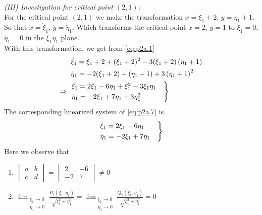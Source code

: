 \documentclass[../main-sheet.tex]{subfiles}
\begin{document}
\begin{soln}[a]
    
    \emph{(III) Investigation for critical point \((2,1)\):}\\
    For the critical point \((2,1)\) we make the transformation \(x=\xi_1+2\), \(y=\eta_1+1\). So that \(\dot{x}=\dot{\xi}_1\), \(\dot{y}=\dot{\eta}_1\). Which transforms the critical point \(x=2\), \(y=1\) to \(\xi_1=0\), \(\eta_1=0\) in the \(\xi_1\eta_1\) plane.\\
    With this transformation, we get from \eqref{eq:p2a.1}
    \begin{align}
        &\dot{\xi}_1=\xi_1+2+(\xi_1+2)^2-3(\xi_1+2)\left(\eta_1+1\right)\notag\\
        &\dot{\eta}_1=-2(\xi_1+2)+(\eta_1+1)+3\left(\eta_1+1\right)^2\notag\\
        \Rightarrow\;\;&\begin{aligned}
            \begin{rcases}
                \dot{\xi}_1=2\xi_1-6\eta_1+\xi_1^2-3\xi_1\eta_1\quad\\
                \dot{\eta}_1=-2\xi_1+7\eta_1+3\eta_1^2
            \end{rcases}
        \end{aligned}\label{eq:p2a.7}
    \end{align}
    The corresponding linearized system of \eqref{eq:p2a.7} is 
    \begin{equation}
        \begin{rcases}
            \dot{\xi}_1=2\xi_1-6\eta_1\\
            \dot{\eta}_1=-2\xi_1+7\eta_1\quad
        \end{rcases}
        \label{eq:p2a.8}
    \end{equation}
    Here we observe that
    \begin{enumerate}[label=(\roman*)]
        \item \(\begin{vmatrix}
            a&b\\
            c&d
        \end{vmatrix}=\begin{vmatrix}
            2&-6\\
            -2&7
        \end{vmatrix}\neq 0\)
        \item \(\displaystyle\lim_{\substack{\xi_1\to 0 \\ \eta_1\to 0}} \frac{P_2(\xi_1,\eta_1)}{\sqrt{\xi_1^2+\eta_1^2}}=\lim_{\substack{\xi_1\to 0 \\ \eta_1\to 0}} \frac{Q_2(\xi_1,\eta_1)}{\sqrt{\xi_1^2+\eta_1^2}}=0\)\\ 
        

\end{enumerate}
\end{soln}
\end{document}
